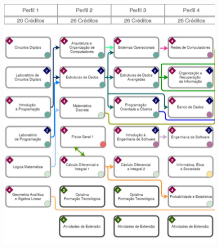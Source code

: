 \begin{figure}[h]
    \centering
    \includegraphics[width=\textwidth]{./imagem/4 primeiros semestres.png}
\end{figure}
